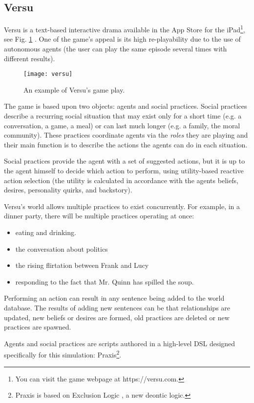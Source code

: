 \subsection{Versu}
\label{sec:versu}
Versu is a text-based interactive drama available in the App Store for the iPad\footnote{You can visit the game webpage at https://versu.com.}, see Fig. \ref{fig:versu}  \cite{evans:versu}.
One of the game's appeal is its high re-playability due to the use of autonomous agents (the user can play the same episode several times with different results).

\begin{figure}
  \centering
    \texttt{[image: versu]}
  \caption{An example of Versu's game play.}
  \label{fig:versu}
\end{figure}

The game is based upon two objects: agents and social practices.
Social practices describe a recurring social situation that may exist only for a short time (e.g. a conversation, a game, a meal) or can last much longer (e.g. a family, the moral community).
These practices coordinate agents via the \textit{roles} they are playing and their main function is to describe the actions the agents can do in each situation.

Social practices provide the agent with a set of suggested actions, but it is up to the agent himself to decide which action to perform, using utility-based reactive action selection (the utility is calculated in accordance with the agents beliefs, desires, personality quirks, and backstory).

Versu's world allows multiple practices to exist concurrently. For example, in a dinner party, there will be multiple practices operating at once:
\begin{itemize}
\item eating and drinking.
\item the conversation about politics
\item the rising flirtation between Frank and Lucy
\item responding to the fact that Mr. Quinn has spilled the soup.
\end{itemize}

Performing an action can result in any sentence being added to the world database.
The results of adding new sentences can be that relationships are updated, new beliefs or desires are formed, old practices are deleted or new practices are spawned.

Agents and social practices are scripts authored in a high-level \ac{DSL} designed specifically for this simulation: Praxis\footnote{Praxis is based on Exclusion Logic \cite{evans:exclusion-logic}, a new deontic logic.}.


